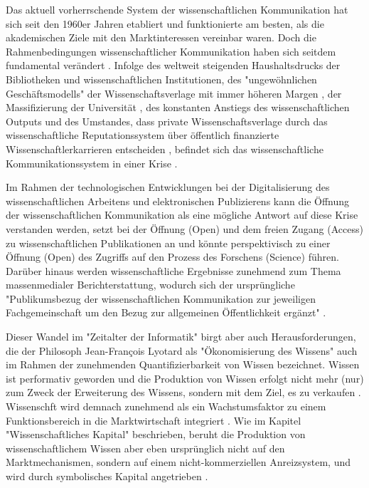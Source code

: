 Das aktuell vorherrschende System der wissenschaftlichen Kommunikation hat sich seit den 1960er Jahren etabliert und funktionierte am besten, als die akademischen Ziele mit den Marktinteressen vereinbar waren. Doch die Rahmenbedingungen wissenschaftlicher Kommunikation haben sich seitdem fundamental verändert \cite{Weiner_2001}. Infolge des weltweit steigenden Haushaltsdrucks der Bibliotheken und wissenschaftlichen Institutionen, des "ungewöhnlichen Geschäftsmodells" \cite{Peek_1996} der Wissenschaftsverlage mit immer höheren Margen \cite{Albert_2006}, der Massifizierung der Universität \cite{Binswanger_2014}, des konstanten Anstiegs des wissenschaftlichen Outputs \cite[:23]{Haustein_2012} und des Umstandes, dass private Wissenschaftsverlage durch das wissenschaftliche Reputationssystem über öffentlich finanzierte Wissenschaftlerkarrieren entscheiden \cite{Heise_2012b}, befindet sich das wissenschaftliche Kommunikationssystem in einer Krise \cite[:11]{BBAW_2015}.

Im Rahmen der technologischen Entwicklungen bei der Digitalisierung des wissenschaftlichen Arbeitens und elektronischen Publizierens kann die Öffnung der wissenschaftlichen Kommunikation als eine mögliche Antwort auf diese Krise verstanden werden, setzt bei der Öffnung (Open) und dem freien Zugang (Access) zu wissenschaftlichen Publikationen an und könnte perspektivisch zu einer Öffnung (Open) des Zugriffs auf den Prozess des Forschens (Science) führen. Darüber hinaus werden wissenschaftliche Ergebnisse zunehmend zum Thema massenmedialer Berichterstattung, wodurch sich der ursprüngliche "Publikumsbezug der wissenschaftlichen Kommunikation zur jeweiligen Fachgemeinschaft um den Bezug zur allgemeinen Öffentlichkeit ergänzt" \cite[:20]{BBAW_2015}.

Dieser Wandel im "Zeitalter der Informatik" birgt aber auch Herausforderungen, die der Philosoph Jean-François Lyotard als "Ökonomisierung des Wissens" \cite[:14]{Lyotard_1979} auch im Rahmen der zunehmenden Quantifizierbarkeit von Wissen bezeichnet. Wissen ist performativ geworden und die Produktion von Wissen erfolgt nicht mehr (nur) zum Zweck der Erweiterung des Wissens, sondern mit dem Ziel, es zu verkaufen \cite[:156]{Troy_2012}. Wissenschft wird demnach zunehmend als ein Wachstumsfaktor zu einem Funktionsbereich in die Marktwirtschaft integriert \cite[:178]{Mikl_2011}. Wie im Kapitel "Wissenschaftliches Kapital" beschrieben, beruht die Produktion von wissenschaftlichem Wissen aber eben ursprünglich nicht auf den Marktmechanismen, sondern auf einem nicht-kommerziellen Anreizsystem, und wird durch symbolisches Kapital angetrieben \cite[:157]{Troy_2012}.

